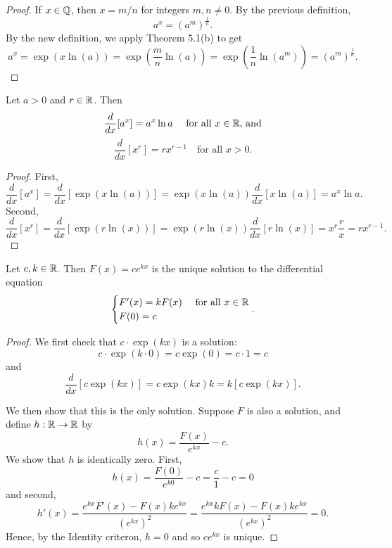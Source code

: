 \documentclass[letterpaper, twoside, 12pt]{book}
\begin{document}
\begin{proof}
    If \(x \in \mathbb Q\), then \(x = m/n\) for integers \(m, n \neq 0\). 
    By the previous definition,
    \[ a^x = (a^m)^{\frac{1}{n}} . \]
    By the new definition, we apply Theorem 5.1(b) to get
    \[ a^x = \exp(x \ln(a)) = 
        \exp(\frac{m}{n} \ln(a)) = 
        \exp(\frac{1}{n} \ln(a^m)) =
    (a^m)^{\frac{1}{n}} .\]
\end{proof}

\begin{proposition}[5.2, 5.3]
  Let \(a>0\) and \(r\in\mathbb R\). Then
  \[
    \frac{d}{dx}[a^x]=a^x\ln a
    ~~~\text{ for all } x\in\mathbb R \text{, and}
  \]
  \[
    \frac{d}{dx}[x^r]=rx^{r-1}
    ~~~\text{ for all } x>0
  .\]
\end{proposition}

\begin{proof}
    First, 
    \[ \frac{d}{dx}[a^x] = \frac{d}{dx}[ \exp(x \ln(a)) ] = 
    \exp(x \ln(a)) \frac{d}{dx} [x\ln(a)] = a^x \ln a . \]
    Second,
    \[ \frac{d}{dx}[x^r] = \frac{d}{dx} [ \exp(r \ln(x)) ] =
    \exp(r \ln(x)) \frac{d}{dx}[r \ln(x)] = x^r \frac{r}{x} = r x^{r-1} .\]
\end{proof}

\begin{theorem}[5.4]
  Let \(c,k\in\mathbb R\). Then \(F(x)=ce^{kx}\) is the unique solution
  to the differential equation
  \[
    \begin{cases}
      F'(x)=kF(x) & \text{ for all } x\in \mathbb R \\
      F(0)=c
    \end{cases}
  .\]
\end{theorem}

\begin{proof}
    We first check that \(c \cdot \exp(kx)\) is a solution:
    \[c \cdot \exp(k \cdot 0) = c \exp(0) = c \cdot 1 = c\] and
    \[\frac{d}{dx}[ c\exp(kx) ] = c \exp(kx) k = k [c \exp(kx)] . \]

    We then show that this is the only solution. Suppose \(F\)
    is also a solution, and define \(h: \mathbb R \to \mathbb R\) by
    \[ h(x) = \frac{F(x)}{e^{kx}} - c .\]
    We show that \(h\) is identically zero. First,
    \[h(x) = \frac{F(0)}{e^{k0}} - c = \frac{c}{1} - c = 0 \]
    and second,
    \[ h'(x) = \frac{e^{kx} F'(x) - F(x) k e^{kx}}{(e^{kx})^2}
    = \frac{ e^{kx} k F(x) - F(x) k e^{kx}}{(e^{kx})^2} = 0 .\]
    Hence, by the Identity criteron, \(h = 0\) and so 
    \(ce^{kx}\) is unique.
\end{proof}
\end{document}
